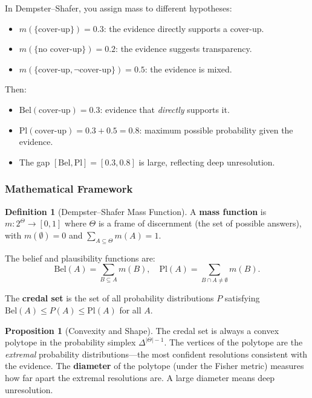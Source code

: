 \documentclass[11pt,letterpaper]{article}
\theoremstyle{definition}
\newtheorem{definition}{Definition}[section]
\newtheorem{proposition}{Proposition}[section]
\theoremstyle{remark}
\begin{document}
In Dempster--Shafer, you assign mass to different hypotheses:
\begin{itemize}
\item $m(\{\text{cover-up}\}) = 0.3$: the evidence directly supports a cover-up.
\item $m(\{\text{no cover-up}\}) = 0.2$: the evidence suggests transparency.
\item $m(\{\text{cover-up}, \neg\text{cover-up}\}) = 0.5$: the evidence is mixed.
\end{itemize}

Then:
\begin{itemize}
\item $\mathrm{Bel}(\text{cover-up}) = 0.3$: evidence that \emph{directly} supports it.
\item $\mathrm{Pl}(\text{cover-up}) = 0.3 + 0.5 = 0.8$: maximum possible probability given the evidence.
\item The gap $[\mathrm{Bel}, \mathrm{Pl}] = [0.3, 0.8]$ is large, reflecting deep unresolution.
\end{itemize}

\subsubsection*{Mathematical Framework}

\begin{definition}[Dempster--Shafer Mass Function]
A \textbf{mass function} is $m: 2^\Theta \to [0, 1]$ where $\Theta$ is a frame of discernment (the set of possible answers), with $m(\emptyset) = 0$ and $\sum_{A \subseteq \Theta} m(A) = 1$.
\end{definition}

The belief and plausibility functions are:
\[
\mathrm{Bel}(A) = \sum_{B \subseteq A} m(B), \quad \mathrm{Pl}(A) = \sum_{B \cap A \neq \emptyset} m(B).
\]

The \textbf{credal set} is the set of all probability distributions $P$ satisfying $\mathrm{Bel}(A) \leq P(A) \leq \mathrm{Pl}(A)$ for all $A$.

\begin{proposition}[Convexity and Shape]
The credal set is always a convex polytope in the probability simplex $\Delta^{|\Theta|-1}$. The vertices of the polytope are the \emph{extremal} probability distributions---the most confident resolutions consistent with the evidence. The \textbf{diameter} of the polytope (under the Fisher metric) measures how far apart the extremal resolutions are. A large diameter means deep unresolution.
\end{proposition}
\end{document}
